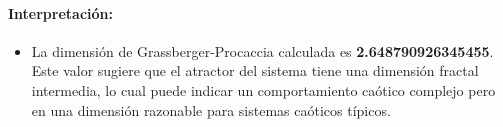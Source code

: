\documentclass[11pt]{article}
\providecommand{\tightlist}{%
      \setlength{\itemsep}{0pt}\setlength{\parskip}{0pt}}
\begin{document}
    \hypertarget{interpretaciuxf3n}{%
\paragraph{Interpretación:}\label{interpretaciuxf3n}}

\begin{itemize}
\tightlist
\item
  La dimensión de Grassberger-Procaccia calculada es
  \textbf{2.648790926345455}. Este valor sugiere que el atractor del
  sistema tiene una dimensión fractal intermedia, lo cual puede indicar
  un comportamiento caótico complejo pero en una dimensión razonable
  para sistemas caóticos típicos.
\end{itemize}


    
    
    
\end{document}
